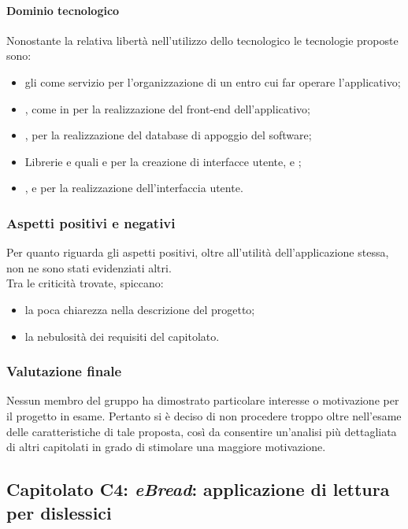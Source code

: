 			\paragraph{Dominio tecnologico}
			Nonostante la relativa libertà nell'utilizzo dello  tecnologico le tecnologie proposte sono:
			\begin{itemize}
				\item gli  come servizio per l'organizzazione di un  entro cui far operare l'applicativo;
				\item {}, come  in  per la realizzazione del front-end dell'applicativo;
				\item {}, per la realizzazione del database di appoggio del software;
				\item Librerie e  quali  e  per la creazione di interfacce utente,  e ;
				\item {},  e  per la realizzazione dell'interfaccia utente.
			\end{itemize}
		\subsubsection{Aspetti positivi e negativi}
		Per quanto riguarda gli aspetti positivi, oltre all'utilità dell'applicazione stessa, non ne sono stati evidenziati altri.
		\\Tra le criticità trovate, spiccano:
		\begin{itemize}
			\item la poca chiarezza nella descrizione del progetto;
			\item la nebulosità dei requisiti del capitolato.
		\end{itemize}
		\subsubsection{Valutazione finale}
		Nessun membro del gruppo ha dimostrato particolare interesse o motivazione per il progetto in esame. Pertanto si è deciso di non procedere 
		troppo oltre nell'esame delle caratteristiche di tale proposta, così da consentire un'analisi più dettagliata di altri capitolati in grado 
		di stimolare una maggiore motivazione.
		
	\subsection{Capitolato C4: \emph{eBread}: applicazione di lettura per dislessici}
